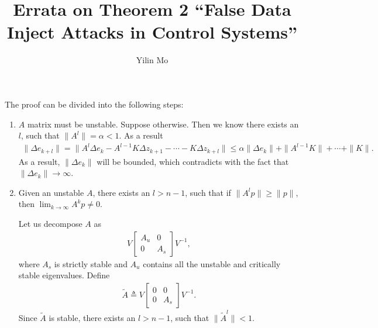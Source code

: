 \documentclass{article}
\title{Errata on Theorem 2 ``False Data Inject Attacks in Control Systems''}
\author{Yilin Mo}
\begin{document}
 \maketitle
The proof can be divided into the following steps:
\begin{enumerate}
\item $A$ matrix must be unstable. Suppose otherwise. Then we know there exists an $l$, such that $\|A^l\| = \alpha < 1$. As a result
  \begin{align*}
   \|\Delta e_{k+l}\| = \|A^l\Delta e_k - A^{l-1}K\Delta z_{k+1} -\cdots - K \Delta z_{k+l}\| \leq \alpha \|\Delta e_k\| + \|A^{l-1}K\| + \cdots + \|K\|.
  \end{align*}
  As a result, $\|\Delta e_k\|$ will be bounded, which contradicts with the fact that $\|\Delta e_k\|  \rightarrow \infty$.
\item Given an unstable $A$, there exists an $l > n-1$, such that if $\|A^lp\| \geq \|p\|$, then $\lim_{k\rightarrow\infty} A^kp \neq 0$.

  Let us decompose $A$ as
  \begin{align*}
    V \begin{bmatrix}
      A_u&0\\
      0&A_s
    \end{bmatrix}V^{-1},
  \end{align*}
 where $A_s$ is strictly stable and $A_u$ contains all the unstable and critically stable eigenvalues. Define
  \begin{align*}
    \tilde A \triangleq  V \begin{bmatrix}
      0&0\\
      0&A_s
    \end{bmatrix}V^{-1}.
  \end{align*}
Since $\tilde A$ is stable, there exists an $l > n-1$, such that $\|\tilde A^l\|  <1$. 


\end{enumerate}
\end{document}
